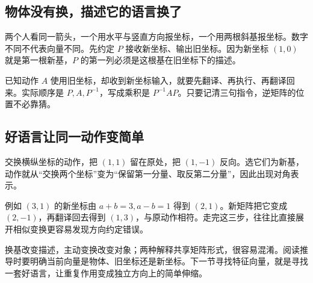 \subsection*{物体没有换，描述它的语言换了}
两个人看同一箭头，一个用水平与竖直方向报坐标，一个用两根斜基报坐标。数字不同不代表向量不同。先约定 $P$ 接收新坐标、输出旧坐标。因为新坐标 $(1,0)$ 就是第一根新基，$P$ 的第一列必须是这根基在旧坐标下的描述。

已知动作 $A$ 使用旧坐标，却收到新坐标输入，就要先翻译、再执行、再翻译回来。实际顺序是 $P,A,P^{-1}$，写成乘积是 $P^{-1}AP$。只要记清三句指令，逆矩阵的位置不必靠猜。

\subsection*{好语言让同一动作变简单}
交换横纵坐标的动作，把 $(1,1)$ 留在原处，把 $(1,-1)$ 反向。选它们为新基，动作就从“交换两个坐标”变为“保留第一分量、取反第二分量”，因此出现对角表示。

例如 $(3,1)$ 的新坐标由 $a+b=3,a-b=1$ 得到 $(2,1)$。新矩阵把它变成 $(2,-1)$，再翻译回去得到 $(1,3)$，与原动作相符。走完这三步，往往比直接展开相似变换更容易发现方向约定错误。

换基改变描述，主动变换改变对象；两种解释共享矩阵形式，很容易混淆。阅读推导时要明确当前向量是物体、旧坐标还是新坐标。下一节寻找特征向量，就是寻找一套好语言，让重复作用变成独立方向上的简单伸缩。

